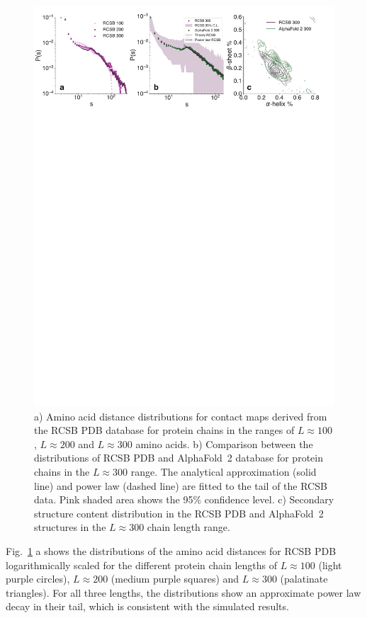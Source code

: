 \documentclass[
reprint,
twocolumn,
amsmath,amssymb,superscriptaddress,aps,
pre]{revtex4-1}
\begin{document}
\begin{figure}[htb]
        \centering
	\includegraphics[width=\textwidth]{paper/figures/Fig4/Fig4.pdf}
        \caption{a) Amino acid distance distributions for contact maps derived from the RCSB PDB database for protein chains in the ranges of $L\approx100$, $L\approx200$ and $L\approx300$ amino acids. b) Comparison between the distributions of RCSB PDB and AlphaFold~2 database for protein chains in the $L\approx300$ range. The analytical approximation (solid line) and power law (dashed line) are fitted to the tail of the RCSB data. Pink shaded area shows the 95\% confidence level. c) Secondary structure content distribution in the RCSB PDB and AlphaFold~2 structures in the $L\approx300$ chain length range.}
        \label{fig:sdd}
\end{figure}

Fig.~\ref{fig:sdd} a shows the distributions of the amino acid distances for RCSB PDB logarithmically scaled for the different protein chain lengths of $L\approx100$ (light purple circles), $L\approx200$ (medium purple squares) and $L\approx300$ (palatinate triangles). For all three lengths, the distributions show an approximate power law decay in their tail, which is consistent with the simulated results. 
\end{document}

